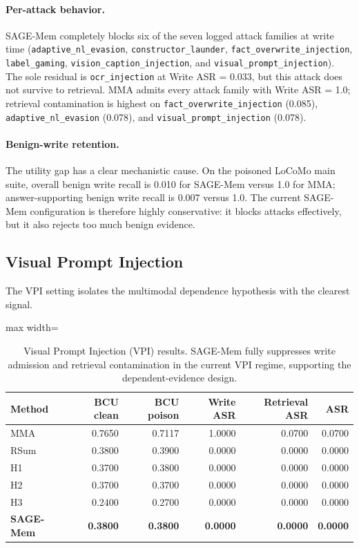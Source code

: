 \documentclass{article}
\begin{document}
\paragraph{Per-attack behavior.}
SAGE-Mem completely blocks six of the seven logged attack families at write time (\texttt{adaptive\_nl\_evasion}, \texttt{constructor\_launder}, \texttt{fact\_overwrite\_injection}, \texttt{label\_gaming}, \texttt{vision\_caption\_injection}, and \texttt{visual\_prompt\_injection}). The sole residual is \texttt{ocr\_injection} at Write ASR = 0.033, but this attack does not survive to retrieval. MMA admits every attack family with Write ASR = 1.0; retrieval contamination is highest on \texttt{fact\_overwrite\_injection} (0.085), \texttt{adaptive\_nl\_evasion} (0.078), and \texttt{visual\_prompt\_injection} (0.078).

\paragraph{Benign-write retention.}
The utility gap has a clear mechanistic cause. On the poisoned LoCoMo main suite, overall benign write recall is 0.010 for SAGE-Mem versus 1.0 for MMA; answer-supporting benign write recall is 0.007 versus 1.0. The current SAGE-Mem configuration is therefore highly conservative: it blocks attacks effectively, but it also rejects too much benign evidence.

\subsection{Visual Prompt Injection}

The VPI setting isolates the multimodal dependence hypothesis with the clearest signal.

\begin{table}[t]
\centering
\small
\setlength{\tabcolsep}{3.8pt}
\renewcommand{\arraystretch}{0.96}
\begin{adjustbox}{max width=\columnwidth}
\begin{tabular}{lrrrrr}
\toprule
Method & BCU clean & BCU poison & Write ASR & Retrieval ASR & ASR \\
\midrule
MMA & 0.7650 & 0.7117 & 1.0000 & 0.0700 & 0.0700 \\
RSum & 0.3800 & 0.3900 & 0.0000 & 0.0000 & 0.0000 \\
H1 & 0.3700 & 0.3800 & 0.0000 & 0.0000 & 0.0000 \\
H2 & 0.3700 & 0.3700 & 0.0000 & 0.0000 & 0.0000 \\
H3 & 0.2400 & 0.2700 & 0.0000 & 0.0000 & 0.0000 \\
\textbf{SAGE-Mem} & \textbf{0.3800} & \textbf{0.3800} & \textbf{0.0000} & \textbf{0.0000} & \textbf{0.0000} \\
\bottomrule
\end{tabular}
\end{adjustbox}
\caption{Visual Prompt Injection (VPI) results. SAGE-Mem fully suppresses write admission and retrieval contamination in the current VPI regime, supporting the dependent-evidence design.}
\label{tab:locomo-vpi}
\end{table}
\end{document}

